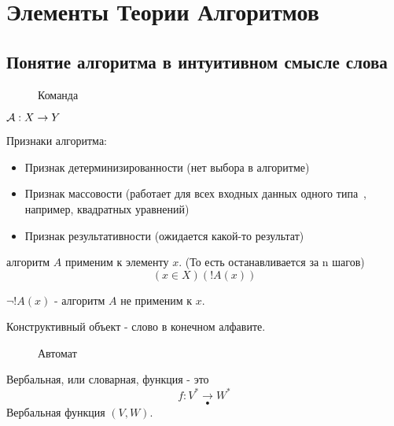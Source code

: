 
\title{}
\author{Козырнов Александр Дмитриевич, ИУ7-42Б}
\date{\today}



\chapter{Элементы Теории Алгоритмов}
\section{Понятие алгоритма в интуитивном смысле слова}


\begin{figure}[ht]
    \centering
    \caption{Команда}
\end{figure}

$ {\cal A}:X \to Y$

\medskip

Признаки алгоритма:
\begin{itemize}
	\item Признак детерминизированности (нет выбора в алгоритме)
	\item Признак массовости (работает для всех входных данных одного типа~, например,
		квадратных уравнений)
	\item Признак результативности (ожидается какой-то результат)
\end{itemize}


\begin{definition}
алгоритм $A$ применим к элементу $x$. (То есть останавливается за n шагов) \[
    (x \in X)(!A(x))
\] 
\end{definition}

\begin{definition}
$\lnot!A(x)$ - алгоритм $A$ не применим к $x$.
\end{definition}

\begin{definition}
Конструктивный объект - слово в конечном алфавите.
\end{definition}

\begin{figure}[h]
    \centering
    \caption{Автомат}
    \label{automat}
\end{figure}

\medskip

\begin{definition}
Вербальная, или словарная, функция - это \[
	f: V^{*} \underset{\bullet}{\to} W^{*}
\] 
Вербальная функция $(V,W)$.

\end{definition}


